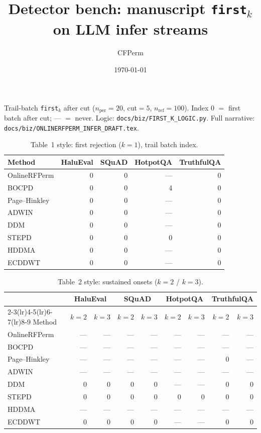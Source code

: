\documentclass[11pt]{article}
\title{Detector bench: manuscript \texttt{first}$_k$ on LLM infer streams}
\author{CFPerm}
\date{\today}
\begin{document}
\maketitle

\noindent
Trail-batch \texttt{first}$_k$ after cut
($n_{\mathrm{per}}=20$, cut$=5$, $n_{\mathrm{ref}}=100$).
Index $0$ $=$ first batch after cut; --- $=$ never.
Logic: \texttt{docs/biz/FIRST\_K\_LOGIC.py}.
Full narrative: \texttt{docs/biz/ONLINERFPERM\_INFER\_DRAFT.tex}.

\begin{table}[h]
\centering
\small
\caption{Table~1 style: first rejection ($k{=}1$), trail batch index.}
\begin{tabular}{lrrrr}
\toprule
Method & HaluEval & SQuAD & HotpotQA & TruthfulQA \\
\midrule
OnlineRFPerm  & 0 & 0 & --- & 0 \\
BOCPD         & 0 & 0 & 4   & 0 \\
Page--Hinkley & 0 & 0 & --- & 0 \\
ADWIN         & 0 & 0 & --- & 0 \\
DDM           & 0 & 0 & --- & 0 \\
STEPD         & 0 & 0 & 0   & 0 \\
HDDMA         & 0 & 0 & --- & 0 \\
ECDDWT        & 0 & 0 & --- & 0 \\
\bottomrule
\end{tabular}
\end{table}

\begin{table}[h]
\centering
\small
\caption{Table~2 style: sustained onsets ($k{=}2$ / $k{=}3$).}
\begin{tabular}{lrrrrrrrr}
\toprule
 & \multicolumn{2}{c}{HaluEval} & \multicolumn{2}{c}{SQuAD}
 & \multicolumn{2}{c}{HotpotQA} & \multicolumn{2}{c}{TruthfulQA} \\
\cmidrule(lr){2-3}\cmidrule(lr){4-5}\cmidrule(lr){6-7}\cmidrule(lr){8-9}
Method & $k{=}2$ & $k{=}3$ & $k{=}2$ & $k{=}3$
 & $k{=}2$ & $k{=}3$ & $k{=}2$ & $k{=}3$ \\
\midrule
OnlineRFPerm  & --- & --- & --- & --- & --- & --- & --- & --- \\
BOCPD         & --- & --- & --- & --- & --- & --- & --- & --- \\
Page--Hinkley & --- & --- & --- & --- & --- & --- & 0   & --- \\
ADWIN         & --- & --- & --- & --- & --- & --- & --- & --- \\
DDM           & 0   & 0   & 0   & 0   & --- & --- & 0   & 0   \\
STEPD         & 0   & 0   & 0   & 0   & 0   & 0   & 0   & 0   \\
HDDMA         & --- & --- & --- & --- & --- & --- & --- & --- \\
ECDDWT        & 0   & 0   & 0   & 0   & --- & --- & 0   & 0   \\
\bottomrule
\end{tabular}
\end{table}
\end{document}
